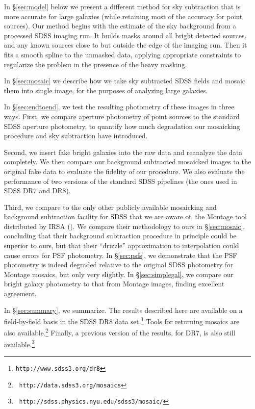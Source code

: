 \documentclass[10pt,preprint]{aastex}
\begin{document}
In \S\ref{sec:model} below we present a different method for sky
subtraction that is more accurate for large galaxies (while retaining
most of the accuracy for point sources). Our method begins with the
estimate of the sky background from a processed SDSS imaging run.  It
builds masks around all bright detected sources, and any known sources
close to but outside the edge of the imaging run. Then it fits a
smooth spline to the unmasked data, applying appropriate constraints
to regularize the problem in the presence of the heavy masking.

In \S\ref{sec:mosaic} we describe how we take sky subtracted SDSS
fields and mosaic them into single image, for the purposes of
analyzing large galaxies.  


In \S\ref{sec:endtoend}, we test the resulting photometry of these
images in three ways.  First, we compare aperture photometry of point
sources to the standard SDSS aperture photometry, to quantify how much
degradation our mosaicking procedure and sky subtraction have
introduced.

Second, we insert fake bright galaxies into the raw data and reanalyze
the data completely.  We then compare our background subtracted
mosaicked images to the original fake data to evaluate the fidelity of
our procedure. We also evaluate the performance of two versions of the
standard SDSS pipelines (the ones used in SDSS DR7 and DR8).

Third, we compare to the only other publicly available mosaicking and
background subtraction facility for SDSS that we are aware of, the
Montage tool distributed by IRSA (\citealt{berriman03a}). We compare
their methodology to ours in \S\ref{sec:mosaic}, concluding that their
background subtraction procedure in principle could be superior to
ours, but that their ``drizzle'' approximation to interpolation could
cause errors for PSF photometry. In \S\ref{sec:psfs}, we demonstrate
that the PSF photometry is indeed degraded relative to the original
SDSS photometry for Montage mosaics, but only very slightly. In
\S\ref{sec:simplegal}, we compare our bright galaxy photometry to that
from Montage images, finding excellent agreement.

In \S\ref{sec:summary}, we summarize. The results described here are
available on a field-by-field basis in the SDSS DR8 data
set.\footnote{\tt http://www.sdss3.org/dr8} Tools for returning
mosaics are also available.\footnote{{\tt
    http://data.sdss3.org/mosaics}} Finally, a previous version of the
results, for DR7, is also still available.\footnote{\tt
  http://sdss.physics.nyu.edu/sdss3/mosaic/}
\end{document}
